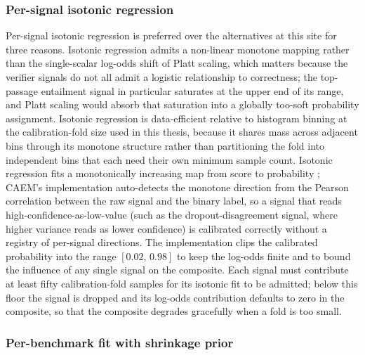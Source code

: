 \subsubsection{Per-signal isotonic regression}
\label{sec:composite-isotonic}

Per-signal isotonic regression is preferred over the alternatives at this site for three reasons. Isotonic regression admits a non-linear monotone mapping rather than the single-scalar log-odds shift of Platt scaling, which matters because the verifier signals do not all admit a logistic relationship to correctness; the top-passage entailment signal in particular saturates at the upper end of its range, and Platt scaling would absorb that saturation into a globally too-soft probability assignment. Isotonic regression is data-efficient relative to histogram binning at the calibration-fold size used in this thesis, because it shares mass across adjacent bins through its monotone structure rather than partitioning the fold into independent bins that each need their own minimum sample count. Isotonic regression fits a monotonically increasing map from score to probability \cite{niculescu2005predicting}; CAEM's implementation auto-detects the monotone direction from the Pearson correlation between the raw signal and the binary label, so a signal that reads high-confidence-as-low-value (such as the dropout-disagreement signal, where higher variance reads as lower confidence) is calibrated correctly without a registry of per-signal directions. The implementation clips the calibrated probability into the range $[0.02,\,0.98]$ to keep the log-odds finite and to bound the influence of any single signal on the composite. Each signal must contribute at least fifty calibration-fold samples for its isotonic fit to be admitted; below this floor the signal is dropped and its log-odds contribution defaults to zero in the composite, so that the composite degrades gracefully when a fold is too small.

\subsubsection{Per-benchmark fit with shrinkage prior}
\label{sec:composite-shrinkage}

